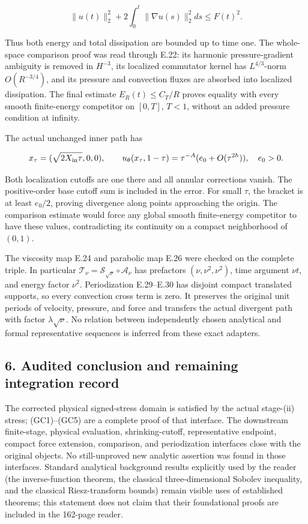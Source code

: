 \documentclass[10pt,a4paper]{article}
\begin{document}
\[
\|u(t)\|_2^2+2\int_0^t\|\nabla u(s)\|_2^2ds\le F(t)^2.
\]

Thus both energy and total dissipation are bounded up to time one. The whole-space comparison proof was read through E.22: its harmonic pressure-gradient ambiguity is removed in \(H^{-3}\), its localized commutator kernel has \(L^{4/3}\)-norm \(O(R^{-3/4})\), and its pressure and convection fluxes are absorbed into localized dissipation. The final estimate \(E_R(t)\le C_T/R\) proves equality with every smooth finite-energy competitor on \([0,T]\), \(T<1\), without an added pressure condition at infinity.

The actual unchanged inner path has

\[
x_\tau=(\sqrt{2X_{\rm in}\tau},0,0),\qquad
u_\theta(x_\tau,1-\tau)=\tau^{-A}(e_0+O(\tau^{2h})),\quad e_0>0.
\]

Both localization cutoffs are one there and all annular corrections vanish. The positive-order base cutoff sum is included in the error. For small \(\tau\), the bracket is at least \(e_0/2\), proving divergence along points approaching the origin. The comparison estimate would force any global smooth finite-energy competitor to have these values, contradicting its continuity on a compact neighborhood of \((0,1)\).

The viscosity map E.24 and parabolic map E.26 were checked on the complete triple. In particular \(\mathscr T_\nu=\mathscr S_{\sqrt\nu}\circ\mathscr A_\nu\) has prefactors \((\nu,\nu^2,\nu^2)\), time argument \(\nu t\), and energy factor \(\nu^2\). Periodization E.29--E.30 has disjoint compact translated supports, so every convection cross term is zero. It preserves the original unit periods of velocity, pressure, and force and transfers the actual divergent path with factor \(\lambda\sqrt\nu\). No relation between independently chosen analytical and formal representative sequences is inferred from these exact adapters.

\subsection{6. Audited conclusion and remaining integration record}\label{gclosure:audited-conclusion-and-remaining-integration-record}

The corrected physical signed-stress domain is satisfied by the actual stage-(ii) stress; (GC1)--(GC5) are a complete proof of that interface. The downstream finite-stage, physical evaluation, shrinking-cutoff, representative endpoint, compact force extension, comparison, and periodization interfaces close with the original objects. No still-unproved new analytic assertion was found in those interfaces. Standard analytical background results explicitly used by the reader (the inverse-function theorem, the classical three-dimensional Sobolev inequality, and the classical Riesz-transform bounds) remain visible uses of established theorems; this statement does not claim that their foundational proofs are included in the 162-page reader.
\end{document}
